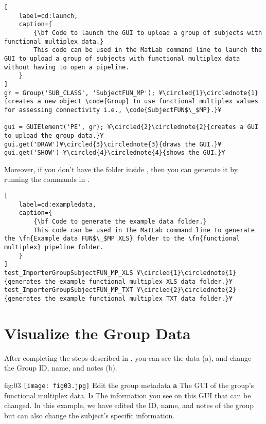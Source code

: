 \documentclass[justified]{tufte-handout}
\begin{document}
%
\begin{lstlisting}[
	label=cd:launch,
	caption={
		{\bf Code to launch the GUI to upload a group of subjects with functional multiplex data.}
		This code can be used in the MatLab command line to launch the GUI to upload a group of subjects with functional multiplex data without having to open a pipeline.
	}
]
gr = Group('SUB_CLASS', 'SubjectFUN_MP'); ¥\circled{1}\circlednote{1}{creates a new object \code{Group} to use functional multiplex values for assessing connectivity i.e., \code{SubjectFUN$\_$MP}.}¥

gui = GUIElement('PE', gr); ¥\circled{2}\circlednote{2}{creates a GUI to upload the group data.}¥
gui.get('DRAW')¥\circled{3}\circlednote{3}{draws the GUI.}¥
gui.get('SHOW') ¥\circled{4}\circlednote{4}{shows the GUI.}¥
\end{lstlisting}

Moreover, if you don't have the  folder inside , then you can generate it by running the commands in .

\begin{lstlisting}[
	label=cd:exampledata,
	caption={
		{\bf Code to generate the example data folder.}
		This code can be used in the MatLab command line to generate the \fn{Example data FUN$\_$MP XLS} folder to the \fn{functional multiplex} pipeline folder.
	}
]
test_ImporterGroupSubjectFUN_MP_XLS ¥\circled{1}\circlednote{1}{generates the example functional multiplex XLS data folder.}¥
test_ImporterGroupSubjectFUN_MP_TXT ¥\circled{2}\circlednote{2}{generates the example functional multiplex TXT data folder.}¥
\end{lstlisting}


\section{Visualize the Group Data}

After completing the steps described in , you can see the data (a), and change the Group ID, name, and notes (b). 

	{fig:03}
	{
	\texttt{[image: fig03.jpg]}
	}
	{Edit the group metadata}
	{ 
	{\bf a} The GUI of the group's functional multiplex data. 
	{\bf b} The information you see on this GUI that can be changed. In this example, we have edited the ID, name, and notes of the group but can also change the subject's specific information.
	}
\end{document}
